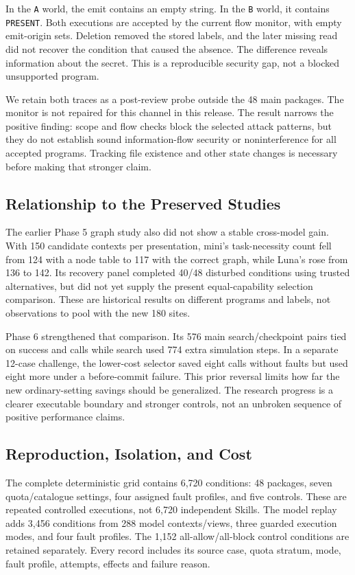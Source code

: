 In the \texttt{A} world, the emit contains an empty string. In the
\texttt{B} world, it contains \texttt{PRESENT}. Both executions are accepted
by the current flow monitor, with empty emit-origin sets. Deletion removed
the stored labels, and the later missing read did not recover the condition
that caused the absence. The difference reveals information about the secret.
This is a reproducible security gap, not a blocked unsupported program.

We retain both traces as a post-review probe outside the 48 main packages.
The monitor is not repaired for this channel in this release. The result
narrows the positive finding: scope and flow checks block the selected attack
patterns, but they do not establish sound information-flow security or
noninterference for all accepted programs. Tracking file existence and other
state changes is necessary before making that stronger claim.

\subsection{Relationship to the Preserved Studies}
The earlier Phase 5 graph study also did not show a stable cross-model gain.
With 150 candidate contexts per presentation, mini's task-necessity count fell
from 124 with a node table to 117 with the correct graph, while Luna's rose from
136 to 142. Its recovery panel completed 40/48 disturbed conditions using
trusted alternatives, but did not yet supply the present equal-capability
selection comparison. These are historical results on different programs and
labels, not observations to pool with the new 180 sites.

Phase 6 strengthened that comparison. Its 576 main search/checkpoint pairs tied
on success and calls while search used 774 extra simulation steps. In a separate
12-case challenge, the lower-cost selector saved eight calls without faults
but used eight more under a before-commit failure. This prior reversal limits
how far the new ordinary-setting savings should be generalized. The research
progress is a clearer executable boundary and stronger controls, not an
unbroken sequence of positive performance claims.

\subsection{Reproduction, Isolation, and Cost}
The complete deterministic grid contains 6,720 conditions: 48 packages, seven
quota/catalogue settings, four assigned fault profiles, and five controls.
These are repeated controlled executions, not 6,720 independent Skills. The
model replay adds 3,456 conditions from 288 model contexts/views, three guarded
execution modes, and four fault profiles. The 1,152 all-allow/all-block control
conditions are retained separately. Every record includes its source case,
quota stratum, mode, fault profile, attempts, effects and failure reason.

